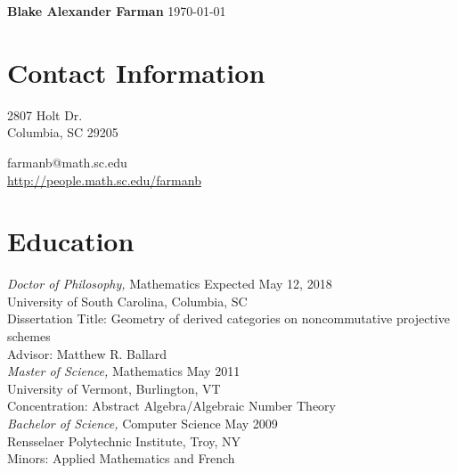 \documentclass{article}
\begin{document}
\noindent\textbf{\large{Blake Alexander Farman}} \hfill \today\\
\noindent\makebox[\linewidth]{\rule{\textwidth}{0.4pt}}

\section*{Contact Information}
\begin{minipage}{1.3in}
  2807 Holt Dr.\\
  Columbia, SC 29205
\end{minipage}
\hfill
\begin{minipage}{2.15in}
  farmanb@math.sc.edu\\
  \hyperref[http://people.math.sc.edu/farmanb]{http://people.math.sc.edu/farmanb}
\end{minipage}

  
  \section*{Education} 
  \textsl{Doctor of Philosophy,} Mathematics \hfill Expected May 12, 2018\\
  University of South Carolina, Columbia, SC\\
  Dissertation Title: Geometry of derived categories on noncommutative projective schemes\\
  Advisor: Matthew R. Ballard\\
  
  \noindent
  \textsl{Master of Science,} Mathematics \hfill May 2011\\
  University of Vermont, Burlington, VT\\
  Concentration: Abstract Algebra/Algebraic Number Theory\\
  
  \noindent\textsl{Bachelor of Science,} Computer Science \hfill May 2009\\
  Rensselaer Polytechnic Institute, Troy, NY\\
  Minors: Applied Mathematics and French
\end{document}
